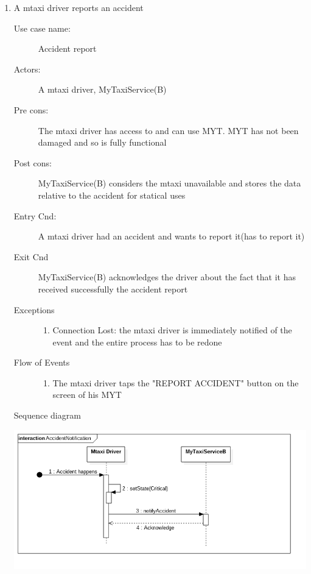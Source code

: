 \documentclass[11pt,titlepage]{article} %
\begin{document}
\begin{enumerate}
	      \item A mtaxi driver reports an accident
		\begin{description}
		        \item [Use case name:] Accident report
		        \item [Actors:] A mtaxi driver, MyTaxiService(B)
		        \item [Pre cons:] The mtaxi driver has access to and can use MYT. MYT has not been damaged and so
		        is fully functional
		        \item [Post cons:] MyTaxiService(B) considers the mtaxi unavailable and stores the data
		        relative to the accident for statical uses
		        \item [Entry Cnd:] A mtaxi driver had an accident and wants to report it(has to report it)
		        \item [Exit Cnd] MyTaxiService(B) acknowledges the driver about the fact that it has received
		        successfully the accident report
		        \item [Exceptions]\hfill
			\begin{enumerate}
			          \item Connection Lost: the mtaxi driver is immediately notified of the event and the entire process has to be redone
			\end{enumerate}
		       \item [Flow of Events]\hfill
			\begin{enumerate}
			          \item The mtaxi driver taps the "REPORT ACCIDENT" button on the screen of his MYT
			\end{enumerate}
		\end{description}
		Sequence diagram
		\begin{center}
		\includegraphics[scale=0.52]{usecase11.png}
		\end{center}



\end{enumerate}
\end{document}

